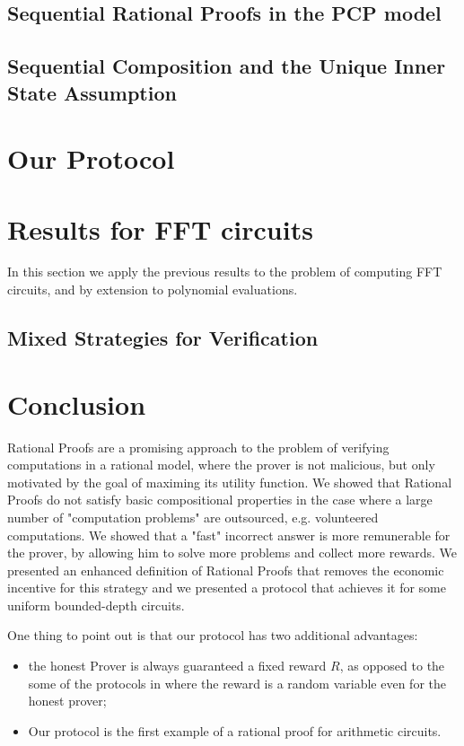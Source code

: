 \subsection{Sequential Rational Proofs in the PCP model}


\subsection{Sequential Composition and the Unique Inner State Assumption}
\label{sec:uisa}


\section{Our Protocol}


\section{Results for FFT circuits}

In this section we apply the previous results to the problem of computing FFT circuits, and by extension to polynomial evaluations. 


\subsection{Mixed Strategies for Verification}



\section{Conclusion}
Rational Proofs are a promising approach to the problem of verifying computations in a rational model, where the prover is not malicious, but only 
motivated by the goal of maximing its utility function. We showed that Rational Proofs do not satisfy basic compositional properties in the case where a large number of "computation problems" are outsourced, e.g. volunteered computations. We showed that a "fast" incorrect answer is more remunerable for the prover, by allowing him to solve more problems and collect more rewards.
We presented an enhanced definition of Rational Proofs that removes the economic incentive  for this strategy and we presented a protocol that achieves it for some uniform bounded-depth circuits.

One thing to point out is that our protocol has two additional advantages: 
\begin{itemize}
\item the honest Prover is always guaranteed a fixed reward $R$, as opposed to the some of the protocols in 
\cite{am,am1} where the reward is a random variable even for the honest prover;
\item Our protocol is the first example of a rational proof for arithmetic circuits. 
\end{itemize}

